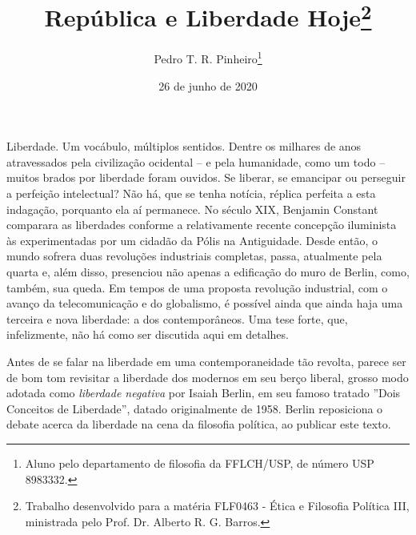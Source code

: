 \documentclass[12pt,a4paper]{article}
\author{Pedro T. R. Pinheiro\footnote{Aluno pelo departamento de filosofia 
da FFLCH/USP, de número USP 8983332. }}
\title{República e Liberdade Hoje\footnote{
	Trabalho desenvolvido para a matéria FLF0463 - Ética e Filosofia 
	Política III, ministrada pelo Prof. Dr. Alberto R. G. Barros. }}
\date{26 de junho de 2020}
\begin{document}
	\maketitle
	
	\onehalfspacing
	\setlength{\parskip}{0.5cm}

	Liberdade. Um vocábulo, múltiplos sentidos. Dentre os milhares de anos 
	atravessados pela civilização ocidental -- e pela humanidade, como um 
	todo -- muitos brados por liberdade foram ouvidos. Se liberar, se 
	emancipar ou perseguir a perfeição intelectual? Não há, que se tenha 
	notícia, réplica perfeita a esta indagação, porquanto ela aí permanece. 
	No século XIX, Benjamin Constant comparara as liberdades conforme a 
	relativamente recente concepção iluminista às experimentadas por um 
	cidadão da Pólis na Antiguidade. Desde então, o mundo sofrera duas 
	revoluções industriais completas, passa, atualmente pela quarta e, 
	além disso, presenciou não apenas a edificação do muro de Berlin, como, 
	também, sua queda. Em tempos de uma proposta revolução industrial, 
	com o avanço da telecomunicação e do globalismo, é possível ainda que 
	ainda haja uma terceira e nova liberdade: a dos contemporâneos. 
	Uma tese forte, que, infelizmente, não há como ser discutida aqui 
	em detalhes. 

	Antes de se falar na liberdade em uma contemporaneidade tão revolta, 
	parece ser de bom tom revisitar a liberdade dos modernos em seu berço 
	liberal, grosso modo adotada como \textit{liberdade negativa} por 
	Isaiah Berlin, em seu famoso tratado ”Dois Conceitos de Liberdade”, 
	datado originalmente de 1958. Berlin reposiciona o debate acerca da 
	liberdade na cena da filosofia política, ao publicar este texto. 
	

	
	
	
\end{document}
